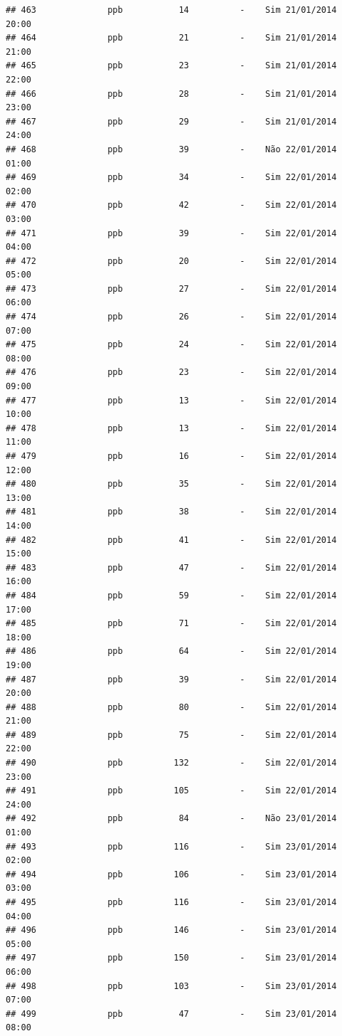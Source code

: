\documentclass[]{book}
\begin{document}
\begin{verbatim}
## 463              ppb           14          -    Sim 21/01/2014 20:00
## 464              ppb           21          -    Sim 21/01/2014 21:00
## 465              ppb           23          -    Sim 21/01/2014 22:00
## 466              ppb           28          -    Sim 21/01/2014 23:00
## 467              ppb           29          -    Sim 21/01/2014 24:00
## 468              ppb           39          -    Não 22/01/2014 01:00
## 469              ppb           34          -    Sim 22/01/2014 02:00
## 470              ppb           42          -    Sim 22/01/2014 03:00
## 471              ppb           39          -    Sim 22/01/2014 04:00
## 472              ppb           20          -    Sim 22/01/2014 05:00
## 473              ppb           27          -    Sim 22/01/2014 06:00
## 474              ppb           26          -    Sim 22/01/2014 07:00
## 475              ppb           24          -    Sim 22/01/2014 08:00
## 476              ppb           23          -    Sim 22/01/2014 09:00
## 477              ppb           13          -    Sim 22/01/2014 10:00
## 478              ppb           13          -    Sim 22/01/2014 11:00
## 479              ppb           16          -    Sim 22/01/2014 12:00
## 480              ppb           35          -    Sim 22/01/2014 13:00
## 481              ppb           38          -    Sim 22/01/2014 14:00
## 482              ppb           41          -    Sim 22/01/2014 15:00
## 483              ppb           47          -    Sim 22/01/2014 16:00
## 484              ppb           59          -    Sim 22/01/2014 17:00
## 485              ppb           71          -    Sim 22/01/2014 18:00
## 486              ppb           64          -    Sim 22/01/2014 19:00
## 487              ppb           39          -    Sim 22/01/2014 20:00
## 488              ppb           80          -    Sim 22/01/2014 21:00
## 489              ppb           75          -    Sim 22/01/2014 22:00
## 490              ppb          132          -    Sim 22/01/2014 23:00
## 491              ppb          105          -    Sim 22/01/2014 24:00
## 492              ppb           84          -    Não 23/01/2014 01:00
## 493              ppb          116          -    Sim 23/01/2014 02:00
## 494              ppb          106          -    Sim 23/01/2014 03:00
## 495              ppb          116          -    Sim 23/01/2014 04:00
## 496              ppb          146          -    Sim 23/01/2014 05:00
## 497              ppb          150          -    Sim 23/01/2014 06:00
## 498              ppb          103          -    Sim 23/01/2014 07:00
## 499              ppb           47          -    Sim 23/01/2014 08:00

\end{verbatim}
\end{document}
